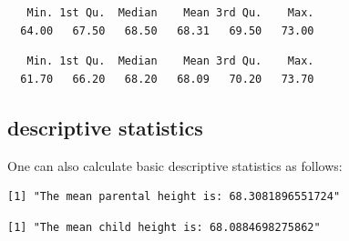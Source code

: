 \documentclass[
  letterpaper,
  DIV=11,
  numbers=noendperiod]{scrreprt}
\newenvironment{Shaded}{\begin{snugshade}}{\end{snugshade}}
\newcommand{\FunctionTok}[1]{\textcolor[rgb]{0.28,0.35,0.67}{#1}}
\newcommand{\NormalTok}[1]{\textcolor[rgb]{0.00,0.23,0.31}{#1}}
\newcommand{\SpecialCharTok}[1]{\textcolor[rgb]{0.37,0.37,0.37}{#1}}
\newcommand{\StringTok}[1]{\textcolor[rgb]{0.13,0.47,0.30}{#1}}
\begin{document}
\begin{verbatim}
   Min. 1st Qu.  Median    Mean 3rd Qu.    Max. 
  64.00   67.50   68.50   68.31   69.50   73.00 
\end{verbatim}

\begin{Shaded}
\end{Shaded}

\begin{verbatim}
   Min. 1st Qu.  Median    Mean 3rd Qu.    Max. 
  61.70   66.20   68.20   68.09   70.20   73.70 
\end{verbatim}

\hypertarget{descriptive-statistics}{%
\subsection{descriptive statistics}\label{descriptive-statistics}}

One can also calculate basic descriptive statistics as follows:

\begin{Shaded}
\end{Shaded}

\begin{verbatim}
[1] "The mean parental height is: 68.3081896551724"
\end{verbatim}

\begin{Shaded}
\end{Shaded}

\begin{verbatim}
[1] "The mean child height is: 68.0884698275862"
\end{verbatim}

\begin{Shaded}
\end{Shaded}
\end{document}
